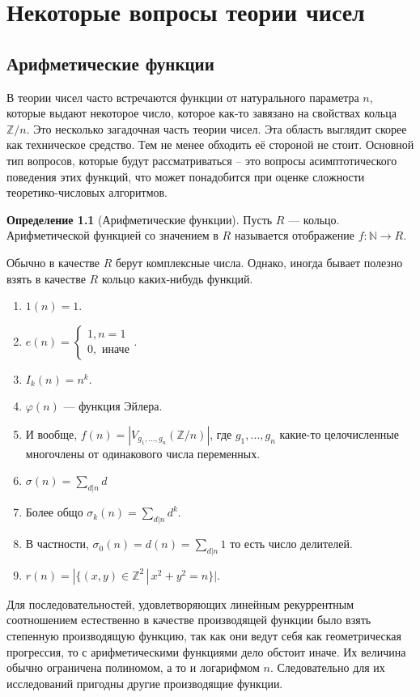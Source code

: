 \documentclass[10pt,a4paper,oneside]{book}
\theoremstyle{definition}
\newtheorem*{defn}{{\color{yellow!30!red} Определение}}
\newcommand{\mb}[1]{\mathbb{#1}}
\def\exm{\noindent {\bf Примеры:}}
\def\dfn{\begin{defn}}
\def\edfn{\end{defn}}
\begin{document}
\chapter{Некоторые вопросы теории чисел}



\section{Арифметические функции}
В теории чисел часто встречаются функции от натурального параметра $n$, которые выдают некоторое число, которое как-то завязано на свойствах кольца $\mb Z/n$. Это несколько загадочная часть теории чисел. Эта область выглядит скорее как техническое средство. Тем не менее обходить её стороной не стоит. Основной тип вопросов, которые будут рассматриваться -- это вопросы асимптотического поведения этих функций, что может понадобится при оценке сложности теоретико-числовых алгоритмов.

\dfn[Арифметические функции] Пусть $R$ --- кольцо. Арифметической функцией со значением в $R$ называется отображение $f\colon \mb N \to R$.
\edfn

Обычно в качестве $R$ берут комплексные числа. Однако, иногда бывает полезно взять в качестве $R$ кольцо каких-нибудь функций.

\exm
\begin{enumerate}
\item $1(n)=1$.
\item $e(n)=\begin{cases} 1, n=1 \\ 0, \text{ иначе}\end{cases}.$
\item $I_k(n)=n^k$.
\item $\varphi(n)$ --- функция Эйлера.
\item И вообще, $f(n)=|V_{g_1,\dots,g_n}(\mb Z/n)|$, где $g_1,\dots,g_n$ какие-то целочисленные многочлены от одинакового числа переменных.
\item $\sigma(n)=\sum_{d|n}d$
\item Более общо $\sigma_k(n)=\sum_{d|n}d^k$.
\item В частности, $\sigma_0(n)=d(n)=\sum_{d|n} 1$ то есть число делителей.
\item $r(n)=|\{(x,y)\in \mb Z^2\,|\, x^2+y^2=n\}|$.
\end{enumerate}

Для последовательностей, удовлетворяющих линейным рекуррентным соотношением естественно в качестве производящей функции было взять степенную производящую функцию, так как они ведут себя как геометрическая прогрессия, то с арифметическими функциями дело обстоит иначе. Их величина обычно ограничена полиномом, а то и логарифмом $n$. Следовательно для их исследований пригодны другие производящие функции.
\end{document}
